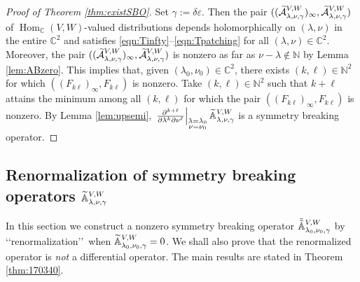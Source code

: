 \begin{proof}
[Proof of Theorem \ref{thm:existSBO}]
Set $\gamma:=\delta \varepsilon$.  
Then the pair 
$
   ((\widetilde{{\mathcal{A}}}_{{\lambda},{\nu},{\gamma}}^{{V,W}})_{\infty}, 
    \widetilde{{\mathcal{A}}}_{{\lambda},{\nu},{\gamma}}^{{V,W}})
$
 of ${\operatorname{Hom}}_{\mathbb{C}}(V,W)$-valued distributions
 depends holomorphically 
 on $(\lambda, \nu)$ in the entire ${\mathbb{C}}^2$
 and satisfies \eqref{eqn:Tinfty}--\eqref{eqn:Tpatching}
 for all $(\lambda, \nu)\in {\mathbb{C}}^2$.  
Moreover, 
the pair 
$
   ((\widetilde{{\mathcal{A}}}_{{\lambda},{\nu},{\gamma}}^{{V,W}})_{\infty}, 
    \widetilde{{\mathcal{A}}}_{{\lambda},{\nu},{\gamma}}^{{V,W}})
$
 is nonzero
 as far as $\nu-\lambda \not \in {\mathbb{N}}$
 by Lemma \ref{lem:ABzero}.  
This implies that, 
 given $(\lambda_0,\nu_0) \in {\mathbb{C}}^2$, 
 there exists $(k,\ell)\in {\mathbb{N}}^2$
 for which $((F_{k \ell})_{\infty},F_{k \ell})$ is nonzero. 
Take $(k, \ell) \in {\mathbb{N}}^2$
 such that $k+\ell$ attains the minimum
 among all $(k,\ell)$
 for which the pair $((F_{k \ell})_{\infty},F_{k \ell})$ is nonzero.  
By Lemma \ref{lem:upsemi}, 
$
 \left.\frac{\partial^{k+\ell}}{\partial \lambda^k \partial \nu^\ell}\right|_{\substack {\lambda=\lambda_0 \\ \nu = \nu_0}} 
 {\widetilde{\mathbb{A}}}_{{\lambda},{\nu},{\gamma}}^{{V, W}}
$
 is a symmetry breaking operator.  
\end{proof}



\subsection{Renormalization of symmetry breaking operators
 ${\widetilde{\mathbb{A}}}_{{\lambda},{\nu},{\gamma}}^{{V,W}}$}
\label{subsec:exAVW}

In this section we construct a nonzero symmetry breaking operator
 $\tilde{\tilde{{\mathbb{A}}}}_{{\lambda_0},{\nu_0},{\gamma}}^{{V, W}}$
 by \lq\lq{renormalization}\rq\rq\
 when ${\widetilde{\mathbb{A}}}_{{\lambda_0},{\nu_0},{\gamma}}^{{V, W}}=0$.  
We shall also prove
 that the renormalized operator is {\it{not}} a differential operator.  
The main results are stated
 in Theorem \ref{thm:170340}.  


